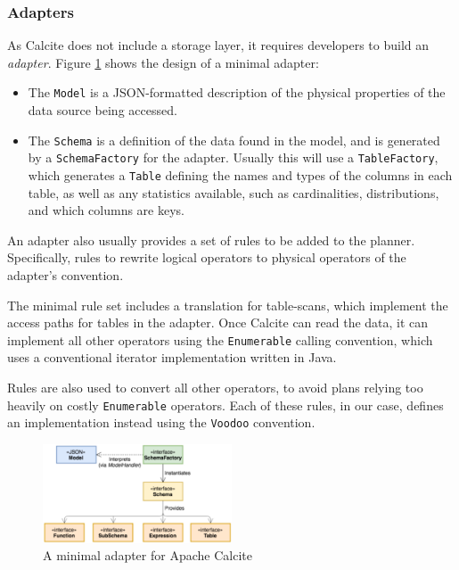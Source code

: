 \subsubsection{Adapters}

As Calcite does not include a storage layer, it requires developers to build an \emph{adapter}. Figure \ref{fig:calcite-adapter} shows the design of a minimal adapter:
\begin{itemize}
    \item The \texttt{Model} is a JSON-formatted description of the physical properties of the data source being accessed.
    \item The \texttt{Schema} is a definition of the data found in the model, and is generated by a \texttt{SchemaFactory} for the adapter. Usually this will use a \texttt{TableFactory}, which generates a \texttt{Table} defining the names and types of the columns in each table, as well as any statistics available, such as cardinalities, distributions, and which columns are keys.
\end{itemize}

An adapter also usually provides a set of rules to be added to the planner. Specifically, rules to rewrite logical operators to physical operators of the adapter's convention.

The minimal rule set includes a translation for table-scans, which implement the access paths for tables in the adapter. Once Calcite can read the data, it can implement all other operators using the \texttt{Enumerable} calling convention, which uses a conventional iterator implementation written in Java.

Rules are also used to convert all other operators, to avoid plans relying too heavily on costly \texttt{Enumerable} operators. Each of these rules, in our case, defines an implementation instead using the \texttt{Voodoo} convention.

\begin{figure}
\includegraphics[width=0.5\textwidth]{design-and-implementation/calcite-adapter.png}
\centering
\caption{A minimal adapter for Apache Calcite \cite{Begoli:2018:ACF:3183713.3190662}}
\label{fig:calcite-adapter}
\end{figure}

